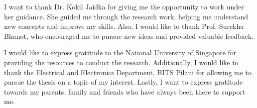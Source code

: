 \documentclass[11pt, a4paper, oneside]{Thesis} %
\begin{document}
\begin{acknowledgements}

I want to thank Dr. Kokil Jaidka for giving me the opportunity to work under her guidance. She guided me through the research work, helping me understand new concepts and improve my skills. Also, I would like to thank Prof. Surekha Bhanot, who encouraged me to pursue new ideas and provided valuable feedback.

I would like to express gratitude to the National University of Singapore for providing the resources to conduct the research. Additionally, I would like to thank the Electrical and Electronics Department, BITS Pilani for allowing me to pursue the thesis on a topic of my interest. Lastly, I want to express gratitude towards my parents, family and friends who have always been there to support me.
\end{acknowledgements}


\pagestyle{fancy}

\tableofcontents %

\listoffigures %

\listoftables %


\clearpage %

\end{document}
